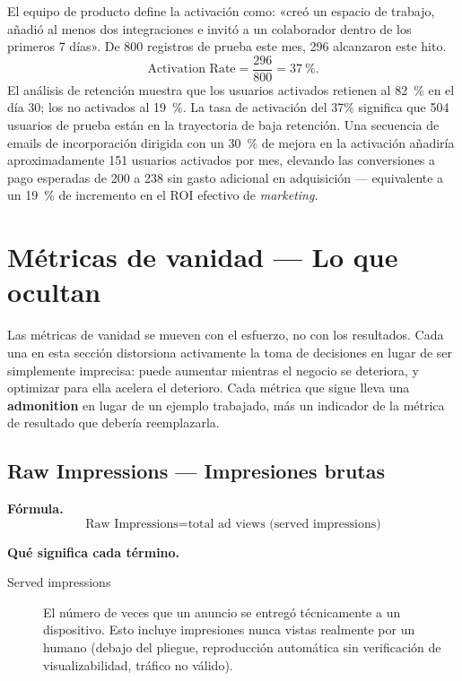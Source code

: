 \begin{example}
El equipo de producto define la activación como: «creó un espacio de trabajo, añadió al
menos dos integraciones e invitó a un colaborador dentro de los primeros 7 días». De
\num{800} registros de prueba este mes, \num{296} alcanzaron este hito.
\[
  \text{Activation Rate} = \frac{296}{800} = \qty{37}{\percent}.
\]
El análisis de retención muestra que los usuarios activados retienen al \qty{82}{\percent}
en el día 30; los no activados al \qty{19}{\percent}. La tasa de activación del 37\% significa
que 504 usuarios de prueba están en la trayectoria de baja retención. Una secuencia de emails
de incorporación dirigida con un \qty{30}{\percent} de mejora en la activación añadiría
aproximadamente 151 usuarios activados por mes, elevando las conversiones a pago esperadas
de 200 a 238 sin gasto adicional en adquisición --- equivalente a un \qty{19}{\percent} de
incremento en el ROI efectivo de \emph{marketing}.
\end{example}


\section{Métricas de vanidad --- Lo que ocultan}

Las métricas de vanidad se mueven con el esfuerzo, no con los resultados. Cada una en esta
sección distorsiona activamente la toma de decisiones en lugar de ser simplemente imprecisa:
puede aumentar mientras el negocio se deteriora, y optimizar para ella acelera el
deterioro. Cada métrica que sigue lleva una \textbf{admonition} en lugar de un ejemplo
trabajado, más un indicador de la métrica de resultado que debería reemplazarla.

\subsection{Raw Impressions --- Impresiones brutas}

\textbf{Fórmula.}
\[
  \text{Raw Impressions} = \text{total ad views (served impressions)}
\]

\textbf{Qué significa cada término.}
\begin{description}
  \item[Served impressions] El número de veces que un anuncio se entregó técnicamente a un
    dispositivo. Esto incluye impresiones nunca vistas realmente por un humano (debajo del
    pliegue, reproducción automática sin verificación de visualizabilidad, tráfico no válido).
\end{description}

